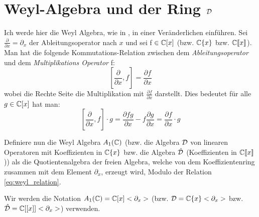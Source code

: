 \section{Weyl-Algebra und der Ring ${\mathcal{D}}$} %
Ich werde hier die Weyl Algebra, wie in
\cite[Chapter~1]{sabbah_cimpa90}, in einer Veränderlichen einführen.
Sei $\frac{\partial}{\partial x}=\partial_x$ der Ableitungsoperator nach $x$
und sei f $\in{\mathbb C}[x]$ (bzw. ${\mathbb C}\{x\}$ bzw. ${\mathbb C}\llbracket x\rrbracket$).
Man hat die folgende Kommutations-Relation zwischen dem
\emph{Ableitungsoperator}
und dem \emph{Multiplikations Operator} f:
\begin{equation}\label{eq:weyl_relation}
  [\frac{\partial}{\partial x},f]=\frac{\partial f}{\partial x}
\end{equation}
wobei die Rechte Seite die Multiplikation mit $\frac{\partial f}{\partial x}$
darstellt. Dies bedeutet für alle $g\in{\mathbb C}[x]$ hat man:
\[
  [\frac{\partial}{\partial x},f]\cdot g
  =\frac{\partial fg}{\partial x} - f\frac{\partial g}{\partial x}
  =\frac{\partial f}{\partial x} \cdot g
\]
\begin{defn}
  Definiere nun die Weyl Algebra $A_1({\mathbb C})$ (bzw. die Algebra ${\mathcal{D}}$ von
  linearen Operatoren mit Koeffizienten in ${\mathbb C}\{x\}$ bzw. die Algebra
  $\hat{{\mathcal{D}}}$ (Koeffizienten in ${\mathbb C}\llbracket x\rrbracket$)) als die
  Quotientenalgebra der freien Algebra, welche von dem Koeffizientenring
  zusammen mit dem Element $\partial_x$, erzeugt wird, Modulo der Relation
  \eqref{eq:weyl_relation}.
\end{defn}
Wir werden die Notation $A_1({\mathbb C})={\mathbb C}[x]<\partial_x>$ (bzw.
${\mathcal{D}}={\mathbb C}\{x\}<\partial_x>$ bzw. $\hat{{\mathcal{D}}}={\mathbb C}[[x]]<\partial_x>$) verwenden.

\begin{comment}
  \textbf{countinho's ansicht:}
  Sei $K\{z_1,...,z_{2n}\}$ eine freie Algebra in $2n$ variablen. Die
  Multiplikation von zwei Monomen ist als einfaches Nebeneinanderschreiben
  Definiert. Betrachte nun den folgenden Homomorphismus:
  \[ \phi:K\{z_1,...,z_{2n}\}\rightarrow A_n \]
  mit $\phi(z_i)=x_i$ und $\phi(z_{i+n})=\partial_i$ für $i\in\{1,..,n\}$.\\
  Sei $J$ das (two sided) Ideal von $K\{x_1,..,x_{2n}\}$ generiert durch:
  \begin{itemize}
    \item $[z_{i+n},z_i]-1$ für $i=1,...,n$
    \item $[z_i,z_j]$
      für $j\neq i+n$ und $1\leq i,j\leq 2n$
  \end{itemize}
  So dass $\phi$ einen homomorphismus
  \[ \phi:K\{z_1,...,z_{2n}\}/J\rightarrow A_n \]
  induziert.

\end{comment}

